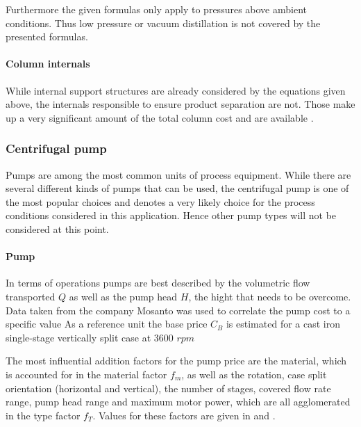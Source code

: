 			Furthermore the given formulas only apply to pressures above ambient conditions. Thus low pressure
			or vacuum distillation is not covered by the presented formulas.
			
		\paragraph{Column internals}
			While internal support structures are already considered by the equations given above, the
			internals responsible to ensure product separation are not. Those make up a very significant
			amount of the total column cost and are available .

	\subsubsection{Centrifugal pump}
		Pumps are among the most common units of process equipment. While there are several different
		kinds of pumps that can be used, the centrifugal pump is one of the most popular choices and
		denotes a very likely choice for the process conditions considered in this application. Hence
		other pump types will not be considered at this point.
		
		\paragraph{Pump}
			In terms of operations pumps are best described by the volumetric flow transported $Q$ as
			well as the pump head $H$, the hight that needs to be overcome. Data taken from the company
			Mosanto was used to correlate the pump cost to a specific value
			As a reference unit the base price $C_B$ is estimated for a cast iron single-stage
			vertically split case at 3600 $rpm$
			
			The most influential addition factors for the pump price are the material, which is accounted
			for in the material factor $f_m$, as well as the rotation, case split orientation (horizontal
			and vertical), the number of stages, covered flow rate range, pump head range and maximum
			motor power, which are all agglomerated in the type factor $f_T$. Values for these factors
			are given in  and .
			

